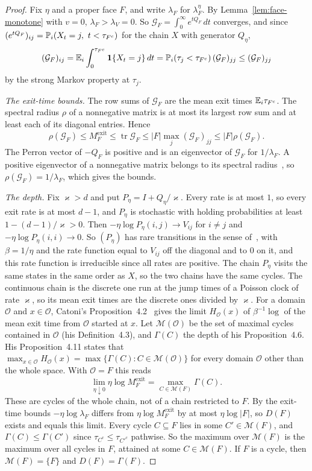 \begin{proof}
Fix $\eta$ and a proper face $F$, and write $\lambda_F$ for $\lambda^\eta_F$.
By Lemma~\ref{lem:face-monotone} with $v=0$, $\lambda_F>\lambda_V=0$. So
$\mathcal G_F=\int_0^\infty e^{tQ_F}\,dt$ converges, and since
$(e^{tQ_F})_{ij}=\Prob_i(X_t=j,\ t<\tau_{F^c})$ for the chain $X$ with
generator $Q_\eta$,
\[
 (\mathcal G_F)_{ij}=\mathbb{E}_i\int_0^{\tau_{F^c}}\mathbf 1\{X_t=j\}\,dt
 =\mathbb{P}_i(\tau_j<\tau_{F^c})\,(\mathcal G_F)_{jj}\le(\mathcal G_F)_{jj}
\]
by the strong Markov property at $\tau_j$.

\emph{The exit-time bounds.} The row sums of $\mathcal G_F$ are the mean exit
times $\mathbb{E}_i\tau_{F^c}$. The spectral radius $\rho$ of a nonnegative matrix is at
most its largest row sum and at least each of its diagonal entries. Hence
\[
 \rho(\mathcal G_F)\le M^{\mathrm{exit}}_F\le\operatorname{tr}\mathcal G_F
 \le|F|\max_j(\mathcal G_F)_{jj}\le|F|\rho(\mathcal G_F).
\]
The Perron vector of $-Q_F$ is positive and is an eigenvector of
$\mathcal G_F$ for $1/\lambda_F$. A positive eigenvector of a nonnegative
matrix belongs to its spectral radius~\cite{bermanplemmons1994}, so
$\rho(\mathcal G_F)=1/\lambda_F$, which gives the bounds.

\emph{The depth.} Fix $\varkappa>d$ and put $P_\eta=I+Q_\eta/\varkappa$. Every
rate is at most $1$, so every exit rate is at most $d-1$, and $P_\eta$ is stochastic
with holding probabilities at least $1-(d-1)/\varkappa>0$. Then $-\eta\log P_\eta(i,j)\to V_{ij}$ for $i\ne j$ and
$-\eta\log P_\eta(i,i)\to0$. So $(P_\eta)$ has rare transitions in the sense
of~\cite[Definition~2.1]{catoni1999}, with $\beta=1/\eta$ and the rate function
equal to $V_{ij}$ off the diagonal and to $0$ on it, and this rate function is
irreducible since all rates are positive. The chain $P_\eta$
visits the same states in the same order as $X$, so the two chains have the
same cycles. The continuous chain is the discrete one run at the jump times of
a Poisson clock of rate $\varkappa$, so its mean exit times are the discrete ones
divided by $\varkappa$. For a domain $\mathcal O$ and $x\in\mathcal O$, Catoni's
Proposition~4.2~\cite{catoni1999} gives the limit $H_{\mathcal O}(x)$ of $\beta^{-1}\log$ of
the mean exit time from $\mathcal O$ started at $x$. Let $\mathcal M(\mathcal O)$ be the set
of maximal cycles contained in $\mathcal O$ (his Definition~4.3), and $\Gamma(C)$ the depth of
his Proposition~4.6. His Proposition~4.11 states that
$\max_{x\in\mathcal O}H_{\mathcal O}(x)=\max\{\Gamma(C):C\in\mathcal M(\mathcal O)\}$ for every
domain $\mathcal O$ other than the whole space. With $\mathcal O=F$ this reads
\[
 \lim_{\eta\downarrow0}\eta\log M^{\mathrm{exit}}_F=\max_{C\in\mathcal M(F)}\Gamma(C).
\]
These are cycles of the whole chain, not of a chain restricted to $F$. By the
exit-time bounds $-\eta\log\lambda_F$ differs from $\eta\log M^{\mathrm{exit}}_F$
by at most $\eta\log|F|$, so $D(F)$ exists and equals this limit. Every cycle
$C\subseteq F$ lies in some $C'\in\mathcal M(F)$, and $\Gamma(C)\le\Gamma(C')$
since $\tau_{C^c}\le\tau_{C'^c}$ pathwise. So the maximum over $\mathcal M(F)$
is the maximum over all cycles in $F$, attained at some $C\in\mathcal M(F)$. If
$F$ is a cycle, then $\mathcal M(F)=\{F\}$ and $D(F)=\Gamma(F)$.
\end{proof}

